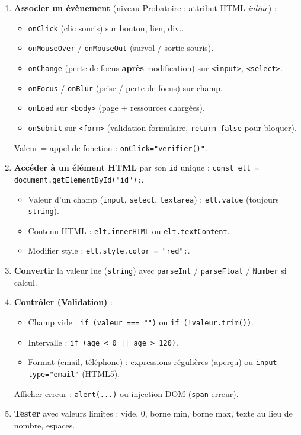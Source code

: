 \documentclass[11pt]{article}
\begin{document}
\begin{methode}
\begin{enumerate}
\item \textbf{Associer un évènement} (niveau Probatoire : attribut HTML \emph{inline}) :
      \begin{itemize}
      \item \texttt{onClick} (clic souris) sur bouton, lien, div...
      \item \texttt{onMouseOver} / \texttt{onMouseOut} (survol / sortie souris).
      \item \texttt{onChange} (perte de focus \textbf{après} modification) sur \texttt{<input>}, \texttt{<select>}.
      \item \texttt{onFocus} / \texttt{onBlur} (prise / perte de focus) sur champ.
      \item \texttt{onLoad} sur \texttt{<body>} (page + ressources chargées).
      \item \texttt{onSubmit} sur \texttt{<form>} (validation formulaire, \texttt{return false} pour bloquer).
      \end{itemize}
      Valeur = appel de fonction : \texttt{onClick="verifier()"}.
\item \textbf{Accéder à un élément HTML} par son \texttt{id} unique : \texttt{const elt = document.getElementById("id");}.
      \begin{itemize}
      \item Valeur d'un champ (\texttt{input}, \texttt{select}, \texttt{textarea}) : \texttt{elt.value} (toujours \texttt{string}).
      \item Contenu HTML : \texttt{elt.innerHTML} ou \texttt{elt.textContent}.
      \item Modifier style : \texttt{elt.style.color = "red";}.
      \end{itemize}
\item \textbf{Convertir} la valeur lue (\texttt{string}) avec \texttt{parseInt} / \texttt{parseFloat} / \texttt{Number} si calcul.
\item \textbf{Contrôler (Validation)} :
      \begin{itemize}
      \item Champ vide : \texttt{if (valeur === "")} ou \texttt{if (!valeur.trim())}.
      \item Intervalle : \texttt{if (age < 0 || age > 120)}.
      \item Format (email, téléphone) : expressions régulières (aperçu) ou \texttt{input type="email"} (HTML5).
      \end{itemize}
      Afficher erreur : \texttt{alert(...)} ou injection DOM (\texttt{span} erreur).
\item \textbf{Tester} avec valeurs limites : vide, 0, borne min, borne max, texte au lieu de nombre, espaces.
\end{enumerate}
\end{methode}
\end{document}
